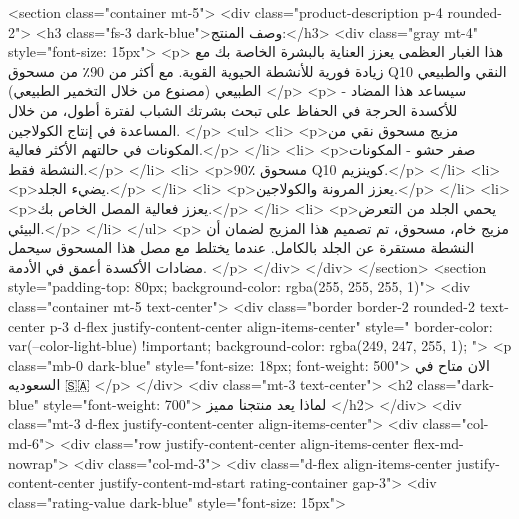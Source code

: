     <section class="container mt-5">
      <div class="product-description p-4 rounded-2">
        <h3 class="fs-3 dark-blue">وصف المنتج:</h3>
        <div class="gray mt-4" style="font-size: 15px">
          <p>
            هذا الغبار العظمى يعزز العناية بالبشرة الخاصة بك مع زيادة فورية
            للأنشطة الحيوية القوية. مع أكثر من 90٪ من مسحوق Q10 النقي والطبيعي
            الطبيعي (مصنوع من خلال التخمير الطبيعي)
          </p>
          <p>
            - سيساعد هذا المضاد للأكسدة الحرجة في الحفاظ على تبحث بشرتك الشباب
            لفترة أطول، من خلال المساعدة في إنتاج الكولاجين.
          </p>
          <ul>
            <li>
              <p>مزيج مسحوق نقي من المكونات في حالتهم الأكثر فعالية.</p>
            </li>
            <li>
              <p>صفر حشو - المكونات النشطة فقط.</p>
            </li>
            <li>
              <p>90٪ مسحوق Q10 كوينزيم.</p>
            </li>
            <li>
              <p>يضيء الجلد.</p>
            </li>
            <li>
              <p>يعزز المرونة والكولاجين.</p>
            </li>
            <li>
              <p>يعزز فعالية المصل الخاص بك.</p>
            </li>
            <li>
              <p>يحمي الجلد من التعرض البيئي.</p>
            </li>
          </ul>
          <p>
            مزيج خام، مسحوق، تم تصميم هذا المزيج لضمان أن النشطة مستقرة عن الجلد
            بالكامل. عندما يختلط مع مصل هذا المسحوق سيحمل مضادات الأكسدة أعمق في
            الأدمة.
          </p>
        </div>
      </div>
    </section>
    <section style="padding-top: 80px; background-color: rgba(255, 255, 255, 1)">
      <div class="container mt-5 text-center">
        <div class="border border-2 rounded-2 text-center p-3 d-flex justify-content-center align-items-center"
          style="
            border-color: var(--color-light-blue) !important;
            background-color: rgba(249, 247, 255, 1);
          ">
          <p class="mb-0 dark-blue" style="font-size: 18px; font-weight: 500">
            الان متاح في السعوديه 🇸🇦
          </p>
        </div>
        <div class="mt-3 text-center">
          <h2 class="dark-blue" style="font-weight: 700">
            لماذا يعد منتجنا مميز
          </h2>
        </div>
        <div class="mt-3 d-flex justify-content-center align-items-center">
          <div class="col-md-6">
            <div class="row justify-content-center align-items-center flex-md-nowrap">
              <div class="col-md-3">
                <div
                  class="d-flex align-items-center justify-content-center justify-content-md-start rating-container gap-3">
                  <div class="rating-value dark-blue" style="font-size: 15px">
